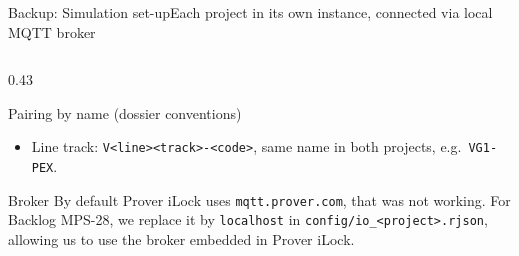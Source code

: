 \documentclass[aspectratio=169,10pt]{beamer}
\newcommand{\smallfont}{\fontsize{7}{8.6}\selectfont}
\begin{document}
\begin{frame}{Backup: Simulation set-up}{Each project in its own instance, connected via local MQTT broker}
\begin{columns}[T,onlytextwidth]
\begin{column}{0.43\textwidth}
\begin{proverbox}{Pairing by name (dossier conventions)}
\begin{itemize}
          \item Line track: \texttt{V<line><track>-<code>}, same name in both projects, e.g.\ \texttt{VG1-PEX}.
        \end{itemize}
      \end{proverbox}
      \vspace{-1mm}
      \begin{proverbox}{Broker}
        \smallfont
        By default Prover iLock uses \texttt{mqtt.prover.com}, that was not working. For Backlog MPS-28, we replace it by \texttt{localhost} in \texttt{config/io\_<project>.rjson}, allowing us to use the broker embedded in Prover iLock.
      \end{proverbox}
    \end{column}
  \end{columns}
\end{frame}
\end{document}
